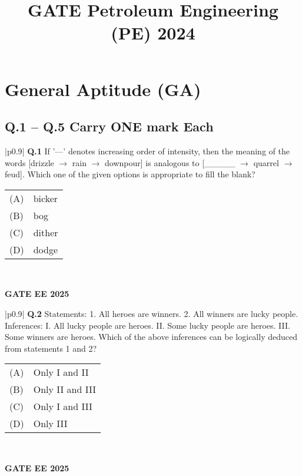 \documentclass{article}
\title{GATE Petroleum Engineering (PE) 2024}
\date{}
\begin{document}
\maketitle

\section*{General Aptitude (GA)}

\subsection*{Q.1 – Q.5 Carry ONE mark Each}

\begin{table}[h]
\centering
\begin{tabular}{|p{0.9\linewidth}|}
\hline
\textbf{Q.1} If '---' denotes increasing order of intensity, then the meaning of the words [drizzle $\rightarrow$ rain $\rightarrow$ downpour] is analogous to [\_\_\_\_\_ $\rightarrow$ quarrel $\rightarrow$ feud]. Which one of the given options is appropriate to fill the blank? \\
\hline
\begin{tabular}{ll}
(A) & bicker \\
(B) & bog \\
(C) & dither \\
(D) & dodge \\
\end{tabular} \\
\hline
\end{tabular}
\end{table}
\textbf{GATE EE 2025}

\begin{table}[h]
\centering
\begin{tabular}{|p{0.9\linewidth}|}
\hline
\textbf{Q.2} Statements: 1. All heroes are winners. 2. All winners are lucky people. Inferences: I. All lucky people are heroes. II. Some lucky people are heroes. III. Some winners are heroes. Which of the above inferences can be logically deduced from statements 1 and 2? \\
\hline
\begin{tabular}{ll}
(A) & Only I and II \\
(B) & Only II and III \\
(C) & Only I and III \\
(D) & Only III \\
\end{tabular} \\
\hline
\end{tabular}
\end{table}
\textbf{GATE EE 2025}
\end{document}
